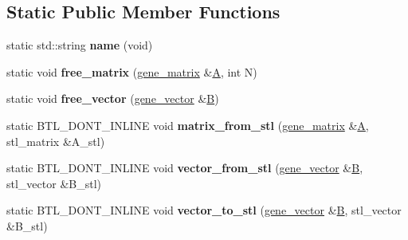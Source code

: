 \subsection*{Static Public Member Functions}
\begin{DoxyCompactItemize}
\item 
\mbox{\label{classeigen2__interface_af5bff3d00a1514dd3fb3ed7b2c6874ba}} 
static std\+::string {\bfseries name} (void)
\item 
\mbox{\label{classeigen2__interface_a04b177fda6aeb04e0df22fe3254ebdbb}} 
static void {\bfseries free\+\_\+matrix} (\hyperlink{group___core___module_class_eigen_1_1_matrix}{gene\+\_\+matrix} \&\hyperlink{group___core___module_class_eigen_1_1_matrix}{A}, int N)
\item 
\mbox{\label{classeigen2__interface_a44270250d08a203ebb5cc443d01b8688}} 
static void {\bfseries free\+\_\+vector} (\hyperlink{group___core___module_class_eigen_1_1_matrix}{gene\+\_\+vector} \&\hyperlink{group___core___module_class_eigen_1_1_matrix}{B})
\item 
\mbox{\label{classeigen2__interface_ac6931cdd07d2445ea68d6ebb375006e6}} 
static B\+T\+L\+\_\+\+D\+O\+N\+T\+\_\+\+I\+N\+L\+I\+NE void {\bfseries matrix\+\_\+from\+\_\+stl} (\hyperlink{group___core___module_class_eigen_1_1_matrix}{gene\+\_\+matrix} \&\hyperlink{group___core___module_class_eigen_1_1_matrix}{A}, stl\+\_\+matrix \&A\+\_\+stl)
\item 
\mbox{\label{classeigen2__interface_aad66484e671420e47aa156f518151ef2}} 
static B\+T\+L\+\_\+\+D\+O\+N\+T\+\_\+\+I\+N\+L\+I\+NE void {\bfseries vector\+\_\+from\+\_\+stl} (\hyperlink{group___core___module_class_eigen_1_1_matrix}{gene\+\_\+vector} \&\hyperlink{group___core___module_class_eigen_1_1_matrix}{B}, stl\+\_\+vector \&B\+\_\+stl)
\item 
\mbox{\label{classeigen2__interface_a0cbdf9e3aa99a6aa0aff8e16dac65521}} 
static B\+T\+L\+\_\+\+D\+O\+N\+T\+\_\+\+I\+N\+L\+I\+NE void {\bfseries vector\+\_\+to\+\_\+stl} (\hyperlink{group___core___module_class_eigen_1_1_matrix}{gene\+\_\+vector} \&\hyperlink{group___core___module_class_eigen_1_1_matrix}{B}, stl\+\_\+vector \&B\+\_\+stl)

\end{DoxyCompactItemize}
